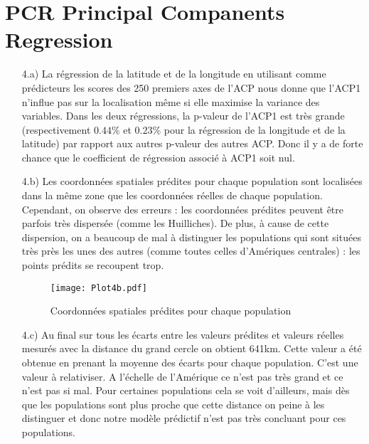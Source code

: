 \documentclass[a4paper, 12pt]{article}
\begin{document}
\section{PCR Principal Companents Regression}

\begin{enumerate}
\setlength{\itemsep}{12pt}

\item[4.a)]
La régression de la latitude et de la longitude en utilisant comme prédicteurs les scores des 250 premiers axes de l'ACP nous donne que l'ACP1 n'influe pas sur la localisation même si elle maximise la variance des variables. Dans les deux régressions, la p-valeur de l'ACP1 est très grande (respectivement $0.44\%$ et $0.23\%$ pour la régression de la longitude et de la latitude) par rapport aux autres p-valeur des autres ACP. Donc il y a de forte chance que le coefficient de régression associé à ACP1 soit nul. 

\item[4.b)] 
Les coordonnées spatiales prédites pour chaque population sont localisées dans la même zone que les coordonnées réelles de chaque population. Cependant, on observe des erreurs : les coordonnées prédites peuvent être parfois très dispersée (comme les Huilliches). De plus, à cause de cette dispersion, on a beaucoup de mal à distinguer les populations qui sont situées très près les unes des autres (comme toutes celles d'Amériques centrales) : les points prédits se recoupent trop.

\begin{figure}[!h]
\begin{center}
\texttt{[image: Plot4b.pdf]}
\caption{Coordonnées spatiales prédites pour chaque population}
\end{center}
\end{figure}

\item[4.c)]
Au final sur tous les écarts entre les valeurs prédites et valeurs réelles mesurés avec la distance du grand cercle on obtient 641km. Cette valeur a été obtenue en prenant la moyenne des écarts pour chaque population. C'est une valeur à relativiser. A l'échelle de l'Amérique ce n'est pas très grand et ce n'est pas si mal. Pour certaines populations cela se voit d'ailleurs, mais dès que les populations sont plus proche que cette distance on peine à les distinguer et donc notre modèle prédictif n'est pas très concluant pour ces populations.

\end{enumerate}
\end{document}
